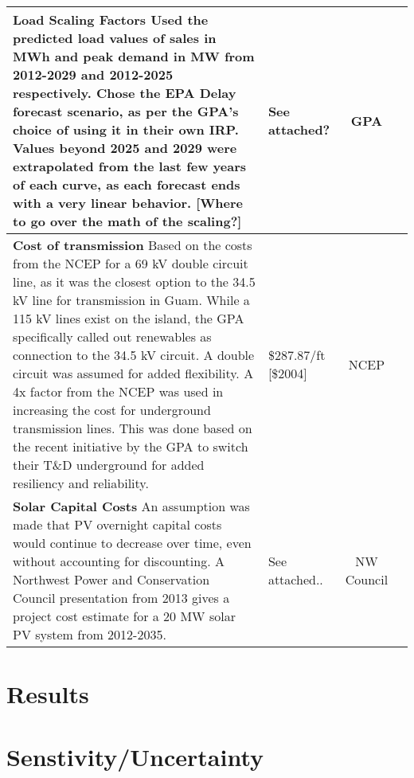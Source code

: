 \documentclass[12pt,letterpaper,fleqn]{report}
\begin{document}
\begin{center}
\begin{longtable}{| p{10cm} | p{4cm} | c | c | }
    \textbf{Load Scaling Factors} Used the predicted load values of
    sales in MWh and peak demand in MW from 2012-2029 and 2012-2025
    respectively. Chose the EPA Delay forecast scenario, as per the
    GPA's choice of using it in their own IRP. Values beyond 2025 and
    2029 were extrapolated from the last few years of each curve, as
    each forecast ends with a very linear behavior. [Where to go over
    the math of the scaling?] & See attached? & GPA & \cite{cruz13}
    \\\hline

    \textbf{Cost of transmission} Based on the costs from the NCEP for
    a 69 kV double circuit line, as it was the closest option to the
    34.5 kV line for transmission in Guam. While a 115 kV lines exist
    on the island, the GPA specifically called out renewables as
    connection to the 34.5 kV circuit. A double circuit was assumed
    for added flexibility. A 4x factor from the NCEP was used in
    increasing the cost for underground transmission lines. This was
    done based on the recent initiative by the GPA to switch their
    T\&D underground for added resiliency and reliability. &
    \$287.87/ft [\$2004] & NCEP & \cite{brown04} \\\hline

    \textbf{Solar Capital Costs} An assumption was made that PV
    overnight capital costs would continue to decrease over time,
    even without accounting for discounting. A Northwest Power and
    Conservation Council presentation from 2013 gives a project cost
    estimate for a 20 MW solar PV system from 2012-2035.  & See
    attached.. & NW Council & \cite{simmons13} \\\hline


  \end{longtable}
\end{center}

\section{Results}

\section{Senstivity/Uncertainty}
\end{document}
